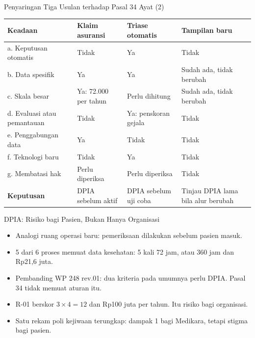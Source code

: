 \documentclass[aspectratio=169, table, 12pt]{beamer}
\begin{document}
\begin{frame}{{\Large Penyaringan Tiga Usulan terhadap Pasal 34 Ayat (2)}}
  \vspace{2pt}
  \scriptsize
  \begin{tabularx}{\textwidth}{|>{\raggedright\arraybackslash}p{}|>{\raggedright\arraybackslash}X|>{\raggedright\arraybackslash}X|>{\raggedright\arraybackslash}X|}
    \hline
    \textbf{Keadaan} & \textbf{Klaim asuransi} & \textbf{Triase otomatis} & \textbf{Tampilan
    baru} \\
    \hline
    a. Keputusan otomatis & Tidak & Ya & Tidak \\ \hline
    b. Data spesifik & Ya & Ya & Sudah ada, tidak berubah \\ \hline
    c. Skala besar & Ya: 72.000 per tahun & Perlu dihitung & Sudah ada, tidak berubah \\ \hline
    d. Evaluasi atau pemantauan & Tidak & Ya: penskoran gejala & Tidak \\ \hline
    e. Penggabungan data & Ya & Tidak & Tidak \\ \hline
    f. Teknologi baru & Tidak & Ya & Tidak \\ \hline
    g. Membatasi hak & Perlu diperiksa & Perlu diperiksa & Tidak \\ \hline
    \textbf{Keputusan} & DPIA sebelum aktif & DPIA sebelum uji coba & Tinjau DPIA lama bila alur
    berubah \\ \hline
  \end{tabularx}
\end{frame}

\begin{frame}{{\Large DPIA: Risiko bagi Pasien, Bukan Hanya Organisasi}}
  \vspace{6pt}
  \small
  \begin{itemize}
    \item Analogi ruang operasi baru: pemeriksaan dilakukan sebelum pasien masuk.
    \item 5 dari 6 proses memuat data kesehatan: 5 kali 72 jam, atau 360 jam dan Rp21,6 juta.
    \item Pembanding WP 248 rev.01: dua kriteria pada umumnya perlu DPIA. Pasal 34 tidak memuat
          aturan itu.
    \item R-01 berskor $3 \times 4 = 12$ dan Rp100 juta per tahun. Itu risiko bagi organisasi.
    \item Satu rekam poli kejiwaan terungkap: dampak 1 bagi Medikara, tetapi stigma bagi pasien.
  \end{itemize}
\end{frame}
\end{document}
